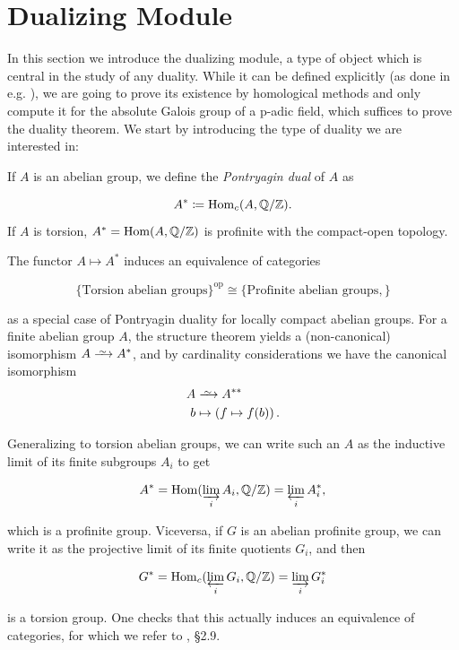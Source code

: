 \documentclass[a4paper, oneside]{memoir}
\begin{document}
\section{Dualizing Module}

In this section we introduce the dualizing module, a type of object which is central in the study of any duality. While it can be defined explicitly (as done in e.g. \cite{Neukirch}),
we are going to prove its existence by homological methods and only compute it for the absolute Galois group of a p-adic field, which suffices to prove the duality theorem. We
start by introducing the type of duality we are interested in:

\begin{definition}
    If \(A\) is an abelian group, we define the \textit{Pontryagin dual} of \(A\) as

    \[
        A^*\coloneqq \operatorname{Hom}_{c}(A,\mathbb{Q}/\mathbb{Z})
        .\]
    If \(A\) is torsion, \(A^*=\operatorname{Hom}(A,\mathbb{Q}/\mathbb{Z})\) is profinite with the compact-open topology.
\end{definition}

\begin{remark}\label{rm:Pontryagin}
    The functor \(A\mapsto A^*\)  induces an equivalence of categories

    \[
        \{ \text{Torsion abelian groups} \}^{\text{op}}  \cong \{ \text{Profinite abelian groups}, \}
    \]

    as a special case of Pontryagin duality for locally compact abelian groups.
    For a finite abelian group \(A\), the structure theorem yields a (non-canonical) isomorphism \(A\Iso A^*\), and by cardinality considerations we have the canonical isomorphism
    \begin{align*}
        A & \Iso A^{**}                           \\
        b & \mapsto \left( f\mapsto f(b) \right).
    \end{align*}

    Generalizing to torsion abelian groups, we can write such an \(A\) as the inductive limit of its finite subgroups \(A_i\) to get

    \[
        A^* = \operatorname{Hom}(\varinjlim_i A_i,\mathbb{Q}/\mathbb{Z}) = \varprojlim_i A_i^*,
    \]

    which is a profinite group. Viceversa, if \(G\) is an abelian profinite group, we can write it as the projective limit of its finite quotients \(G_i\), and then

    \[
        G^* = \operatorname{Hom}_{c}( \varprojlim_i G_i,\mathbb{Q}/\mathbb{Z} ) = \varinjlim_i G_i^*
    \]

    is a torsion group. One checks that this actually induces an equivalence of categories, for which we refer to \cite{RibesZalesskii}, \S 2.9.
\end{remark}
\end{document}
